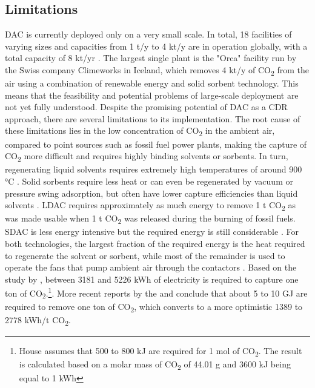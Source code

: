 \subsection*{Limitations}
DAC is currently deployed only on a very small scale. In total, 18 facilities of varying sizes and capacities from 1 t/y to 4 kt/y are in operation globally, with a total capacity of 8 kt/yr \parencite[18]{IEA2022DirectZero}. The largest single plant is the "Orca" facility run by the Swiss company Climeworks in Iceland, which removes 4 kt/y of CO\textsubscript{2} from the air using a combination of renewable energy and solid sorbent technology. This means that the feasibility and potential problems of large-scale deployment are not yet fully understood.
Despite the promising potential of DAC as a CDR approach, there are several limitations to its implementation. The root cause of these limitations lies in the low concentration of CO\textsubscript{2} in the ambient air, compared to point sources such as fossil fuel power plants, making the capture of CO\textsubscript{2} more difficult and requires highly binding solvents or sorbents. In turn, regenerating liquid solvents requires extremely high temperatures of around 900 °C \parencite[23]{IEA2022DirectZero}. Solid sorbents require less heat or can even be regenerated by vacuum or pressure swing adsorption, but often have lower capture efficiencies than liquid solvents \parencite[192]{NAS2018NegativeAgenda}.
LDAC requires approximately as much energy to remove 1 t CO\textsubscript{2} as was made usable when 1 t CO\textsubscript{2} was released during the burning of fossil fuels. SDAC is less energy intensive but the required energy is still considerable \parencite{Linow2022Kurzimpuls-Perspektiven2-Emissionen}. For both technologies, the largest fraction of the required energy is the heat required to regenerate the solvent or sorbent, while most of the remainder is used to operate the fans that pump ambient air through the contactors \parencite[203]{NAS2018NegativeAgenda}. Based on the study by \textcite{House2007ElectrochemicalChange}, between 3181 and 5226 kWh of electricity is required to capture one ton of CO\textsubscript{2}.\footnote{House assumes that 500 to 800 kJ are required for 1 mol of CO\textsubscript{2}. The result is calculated based on a molar mass of CO\textsubscript{2} of 44.01 g and 3600 kJ being equal to 1 kWh}. More recent reports by the \textcite{NAS2018NegativeAgenda} and \textcite{Mulligan2020CarbonShot:States} conclude that about 5 to 10 GJ are required to remove one ton of CO\textsubscript{2}, which converts to a more optimistic 1389 to 2778 kWh/t CO\textsubscript{2}.
